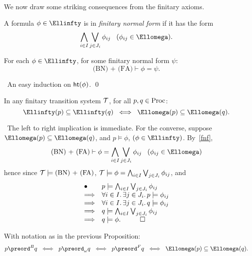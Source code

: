We now draw some striking consequences from the finitary axioms.
\begin{definition}
{\rm A formula $\phi \in \Ellinfty$ is in {\em finitary normal form} if it has the form}
\[ \bigwedge_{i \in I} \bigvee_{j \in J_{i}} \phi_{ij} \;\;\; (\phi_{ij} \in \Ellomega ). \]
\end{definition}

\begin{lemma} \label{fnf}
For each $\phi \in \Ellinfty$, for some finitary normal form $\psi$:
\[ \mbox{(BN) + (FA)} \vdash \phi = \psi . \]
\end{lemma}

\proof\ An easy induction on ${\sf ht}(\phi)$. \qed

\begin{proposition}
\label{p18}
In any finitary transition system ${\cal T}$, for all $p, q \in {\rm Proc}$:
\[ \Ellinfty (p) \subseteq \Ellinfty (q) \;\; \Longleftrightarrow \;\; \Ellomega (p) \subseteq \Ellomega (q) . \]
\end{proposition}

\proof\ The left to right implication is immediate.
For the converse, suppose $ \Ellomega (p) \subseteq \Ellomega (q)$, and $p \models \phi$, $(\phi \in \Ellinfty )$.
By~\ref{fnf},
\[ \mbox{(BN) + (FA)} \vdash \phi = \bigwedge_{i \in I} \bigvee_{j \in J_{i}} \phi_{ij} \;\;\;  (\phi_{ij} \in \Ellomega ) \]
hence since ${\cal T} \models \mbox{(BN) + (FA)}$, ${\cal T} \models \phi = \bigwedge_{i \in I} \bigvee_{j \in J_{i}} \phi_{ij}$, and
\[ \begin{array}{ll}
\bullet & p \models \bigwedge_{i \in I} \bigvee_{j \in J_{i}} \phi_{ij} \\
\Longrightarrow & \forall i \in I . \, \exists j \in J_{i} . \, p \models \phi_{ij} \\
\Longrightarrow &  \forall i \in I . \, \exists j \in J_{i} . \, q \models \phi_{ij} \\
\Longrightarrow & q \models \bigwedge_{i \in I} \bigvee_{j \in J_{i}} \phi_{ij} \\
\Longrightarrow & q \models \phi . \;\;\; \qed
\end{array} \]

\begin{theorem}
\label{fct}
With notation as in the previous Proposition:
\[ p \preord^{B} q \;\; \Longleftrightarrow \;\; p \preord_{\omega} q \;\; \Longleftrightarrow \;\; p \preord^{F} q \;\; \Longleftrightarrow \;\; \Ellomega (p) \subseteq \Ellomega (q) . \]
\end{theorem}


